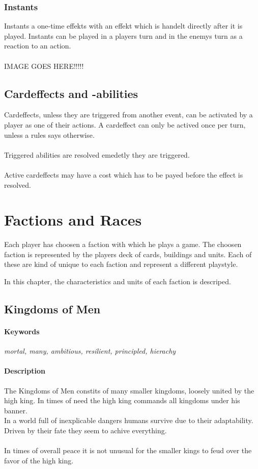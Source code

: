 \documentclass[a5paper,pagesize,10pt,bibtotoc,pointlessnumbers,
normalheadings,DIV=9,twoside=false]{scrbook}
\begin{document}
\subsection{Instants}
Instants a one-time effekts with an effekt which is handelt directly after it is played. Instants can be played in a players turn and in the enemys turn as a reaction to an action.\\
\\
IMAGE GOES HERE!!!!!

\section{Cardeffects and -abilities}
Cardeffects, unless they are triggered from another event, can be activated by a player as one of their actions. A cardeffect can only be actived once per turn, unless a rules says otherwise.\\
\\
Triggered abilities are resolved emedetly they are triggered.\\
\\
Active cardeffects may have a cost which has to be payed before the effect is resolved.

\chapter{Factions and Races}
Each player has choosen a faction with which he plays a game. The choosen faction is represented by the players deck of cards, buildings and units. Each of these are kind of unique to each faction and represent a different playstyle.

In this chapter, the characteristics and units of each faction is descriped.
\newpage
\section{Kingdoms of Men}
\subsubsection{Keywords}
\emph{mortal, many, ambitious, resilient, principled, hierachy}

\subsubsection{Description}
The Kingdoms of Men constits of many smaller kingdoms, loosely united by the high king. In times of need the high king commands all kingdoms under his banner.\\
In a world full of inexplicable dangers humans survive due to their adaptability. Driven by their fate they seem to achive everything.\\
\\
In times of overall peace it is not unusual for the smaller kings to feud over the favor of the high king.
\end{document}

